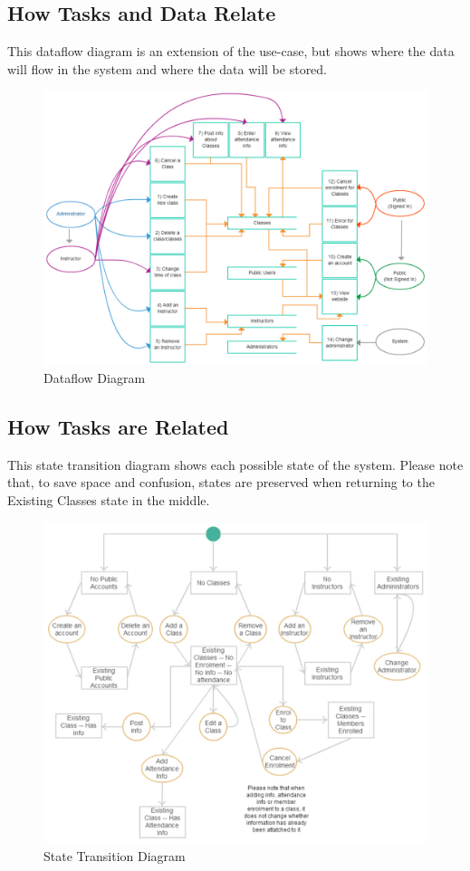 \documentclass[11pt, article]{article}
\begin{document}
	\subsection{How Tasks and Data Relate}
	This dataflow diagram is an extension of the use-case, but shows where the data will flow in the system and where the data will be stored.
		\begin{figure}[ht!]
	\includegraphics[scale=0.6]{images/dataflow}
 	\caption{Dataflow Diagram}
	\end{figure}
	
	\newpage
	\subsection{How Tasks are Related}
	This state transition diagram shows each possible state of the system. Please note that, to save space and confusion, states are preserved when returning to the Existing Classes state in the middle. 
			\begin{figure}[ht!]
	\includegraphics[scale=0.8]{images/statediagram}
 	\caption{State Transition Diagram}
	\end{figure}
	
\end{document}
